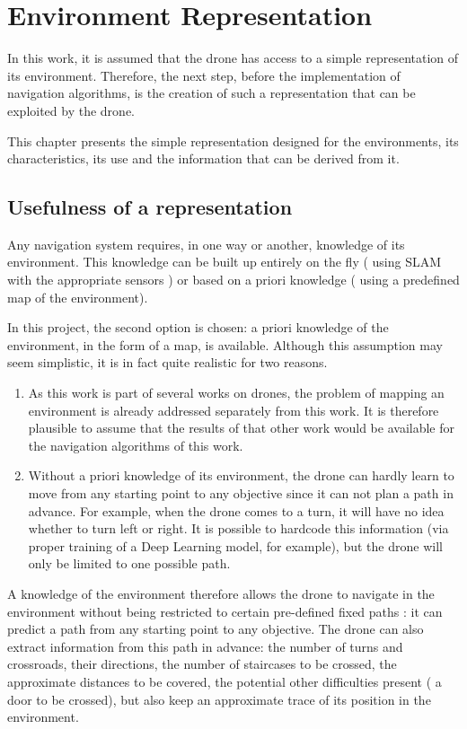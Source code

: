 \chapter{Environment Representation}\label{ch:environment.representation}

In this work, it is assumed that the drone has access to a simple representation of its environment. Therefore, the next step, before the implementation of navigation algorithms, is the creation of such a representation that can be exploited by the drone.

This chapter presents the simple representation designed for the environments, its characteristics, its use and the information that can be derived from it.

\section{Usefulness of a representation}

Any navigation system requires, in one way or another, knowledge of its environment. This knowledge can be built up entirely on the fly (\eg{} using SLAM with the appropriate sensors \cite{aguilar2017visual, bryson2007building}) or based on a priori knowledge (\eg{} using a predefined map of the environment).

In this project, the second option is chosen: a priori knowledge of the environment, in the form of a map, is available. Although this assumption may seem simplistic, it is in fact quite realistic for two reasons.

\begin{enumerate}
    \item As this work is part of several works on drones, the problem of mapping an environment is already addressed separately from this work. It is therefore plausible to assume that the results of that other work would be available for the navigation algorithms of this work.
    \item Without a priori knowledge of its environment, the drone can hardly learn to move from any starting point to any objective since it can not plan a path in advance. For example, when the drone comes to a turn, it will have no idea whether to turn left or right. It is possible to hardcode this information (via proper training of a Deep Learning model, for example), but the drone will only be limited to one possible path.
\end{enumerate}

A knowledge of the environment therefore allows the drone to navigate in the environment without being restricted to certain pre-defined fixed paths : it can predict a path from any starting point to any objective. The drone can also extract information from this path in advance: the number of turns and crossroads, their directions, the number of staircases to be crossed, the approximate distances to be covered, the potential other difficulties present (\eg{} a door to be crossed), but also keep an approximate trace of its position in the environment.

